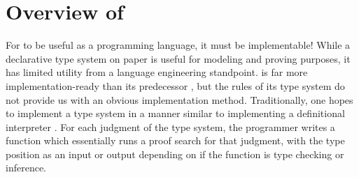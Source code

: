 





\section{Overview of \bilambdaamor}
\label{sec:bilambdaamor-overview}
For \dlambdaamor to be useful as a programming language, it must be implementable! While a declarative type system on paper is useful for modeling and proving purposes, it has limited utility from a language engineering standpoint. \dlambdaamor is far more implementation-ready than its predecessor \lambdaamor, but the rules of its type system do not provide us with an obvious implementation method. Traditionally, one hopes to implement a type system in a manner similar to implementing a definitional interpreter \cite{reynolds:acm72}. For each judgment of the type system, the programmer writes a function which essentially runs a proof search for that judgment, with the type position as an input or output depending on if the function is type checking or inference.

